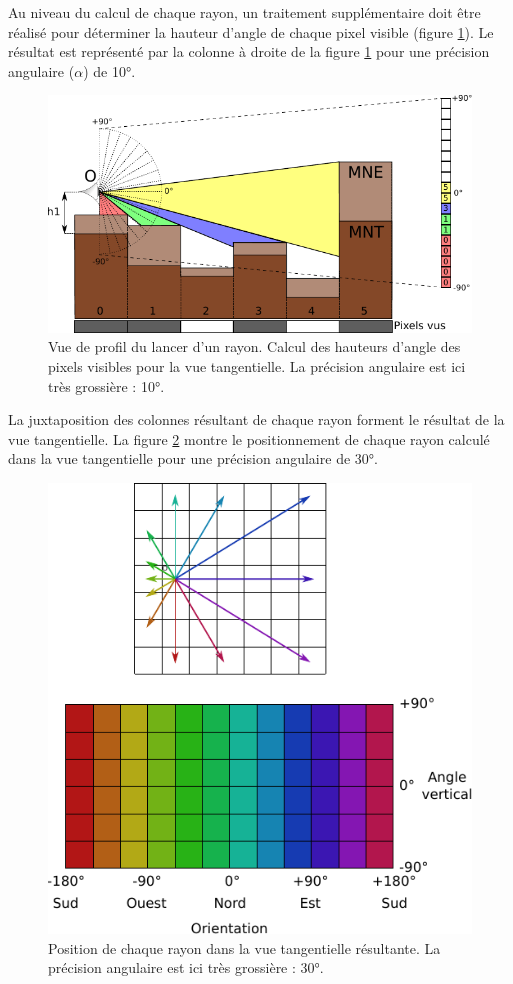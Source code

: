 \documentclass{report}
\begin{document}
Au niveau du calcul de chaque rayon, un traitement supplémentaire doit être réalisé pour déterminer la hauteur d'angle de chaque pixel visible (figure \ref{ray_side_tan}). Le résultat est représenté par la colonne à droite de la figure \ref{ray_side_tan} pour une précision angulaire ($\alpha$) de 10°.

\begin{figure}[H]
	\includegraphics{img/ray_side_tan-fr.pdf} 
	\caption{Vue de profil du lancer d'un rayon. Calcul des hauteurs d'angle des pixels visibles pour la vue tangentielle. La précision angulaire est ici très grossière : 10°.}
	\label{ray_side_tan}
\end{figure}

La juxtaposition des colonnes résultant de chaque rayon forment le résultat de la vue tangentielle. La figure \ref{grid_tan_result} montre le positionnement de chaque rayon calculé dans la vue tangentielle pour une précision angulaire de 30°.

\begin{figure}[H]
	\includegraphics{img/grid_tan_result.pdf} 
	\caption{Position de chaque rayon dans la vue tangentielle résultante. La précision angulaire est ici très grossière : 30°.}
	\label{grid_tan_result}
\end{figure}
\end{document}
